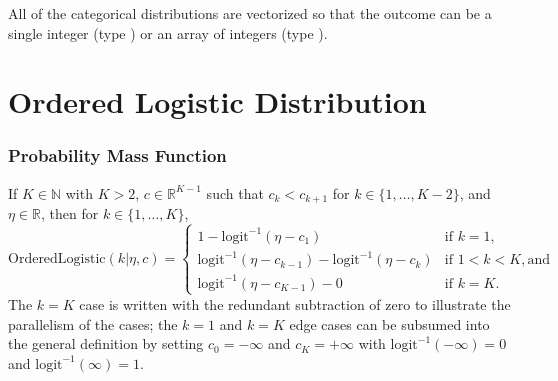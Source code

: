 \begin{description}
All of the categorical distributions are vectorized so that the outcome  can be a single integer (type ) or an array of integers (type ).


\begin{description}     \end{description}


\begin{description}  \end{description}


\begin{description}  \end{description}


\section{Ordered Logistic Distribution}


\subsubsection{Probability Mass Function}


If $K \in \mathbb{N}$ with $K > 2$, $c \in \mathbb{R}^{K-1}$ such that $c_k < c_{k+1}$ for $k \in \{1,\ldots,K-2\}$, and $\eta \in \mathbb{R}$, then for $k \in \{1,\ldots,K\}$, \[ \text{OrderedLogistic}(k|\eta,c) = \left\{ \begin{array}{ll} 1 - \text{logit}^{-1}(\eta - c_1)  &  \text{if } k = 1, \\[4pt] \text{logit}^{-1}(\eta - c_{k-1}) - \text{logit}^{-1}(\eta - c_{k})  &  \text{if } 1 < k < K, \text{and} \\[4pt] \text{logit}^{-1}(\eta - c_{K-1}) - 0  &  \text{if } k = K. \end{array} \right. \] The $k=K$ case is written with the redundant subtraction of zero to illustrate the parallelism of the cases; the $k=1$ and $k=K$ edge cases can be subsumed into the general definition by setting $c_0 = -\infty$ and $c_K = +\infty$ with $\text{logit}^{-1}(-\infty) = 0$ and $\text{logit}^{-1}(\infty) = 1$.



\end{description}
